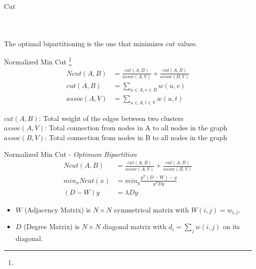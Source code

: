 \documentclass[10pt,xcolor=svgnames]{beamer} %
\begin{document}
\begin{frame}{Cut}
\begin{columns}
\begin{figure}
{
            }
    \end{figure}
    
    \end{columns}
    The optimal bipartitioning is the one that minimizes $cut$ values.
\end{frame}

\begin{frame}{Normalized Min Cut \footnote{}}
    \begin{align}
        Ncut(A,B) & = \frac{cut(A,B)}{assoc(A,V)} + \frac{cut(A,B)}{assoc(B,V)} \\
        cut(A,B) &= \sum_{u \in A, v \in B} w(u,v)\\
        assoc(A,V) &= \sum_{u \in A, t\in V} w(u,t)
    \end{align}
    
$cut(A,B)$: Total weight of the edges between two clusters \\
$assoc(A,V)$: Total connection from nodes in A to all nodes in the graph \\
$assoc(B,V)$: Total connection from nodes in B to all nodes in the graph \\

\end{frame}

\begin{frame}{Normalized Min Cut - \textit{Optimum Bipartition}}
    \begin{align}
        Ncut(A,B) & = \frac{cut(A,B)}{assoc(A,V)} + \frac{cut(A,B)}{assoc(B,V)} \\
        min_xNcut(x) &= min_y\frac{y^T(D-W)-y}{y^T D y} \\
        (D-W)y &= \lambda D y
    \end{align}
    
\begin{itemize}
    \item $W$ (Adjacency Matrix) is $N \times N$ symmetrical matrix with $W(i,j) = w_{i,j} $.
    \item $D$ (Degree Matrix) is $N \times N$ diagonal matrix with $d_i = \sum_j w(i,j) $ on its diagonal. \\
\end{itemize}

\end{frame}
\end{document}
